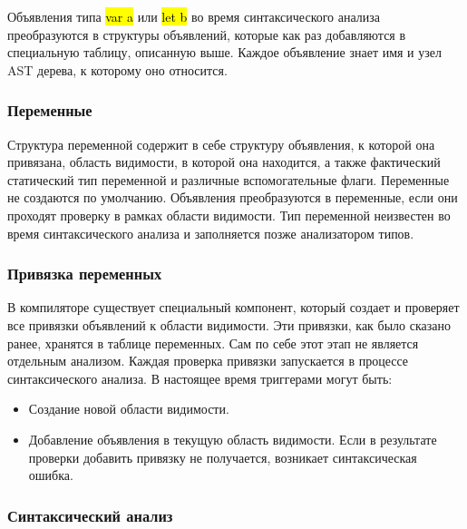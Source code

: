 Объявления типа \hl{var a} или \hl{let b} во время синтаксического анализа преобразуются в структуры объявлений, которые
как раз добавляются в специальную таблицу, описанную выше.
Каждое объявление знает имя и узел AST дерева, к которому оно относится.

\subsubsection{Переменные}

Структура переменной содержит в себе структуру объявления, к которой она привязана, область видимости, в которой она
находится, а также фактический статический тип переменной и различные вспомогательные флаги.
Переменные не создаются по умолчанию.
Объявления преобразуются в переменные, если они проходят проверку в рамках области видимости.
Тип переменной неизвестен во время синтаксического анализа и заполняется позже анализатором типов.

\subsubsection{Привязка переменных}

В компиляторе существует специальный компонент, который создает и проверяет все привязки объявлений к области видимости.
Эти привязки, как было сказано ранее, хранятся в таблице переменных.
Сам по себе этот этап не является отдельным анализом.
Каждая проверка привязки запускается в процессе синтаксического анализа.
В настоящее время триггерами могут быть:

\begin{itemize}[left=2em]
    \item Создание новой области видимости.
    \item Добавление объявления в текущую область видимости.
    Если в результате проверки добавить привязку не получается, возникает синтаксическая ошибка.
\end{itemize}

\subsubsection{Синтаксический анализ}

